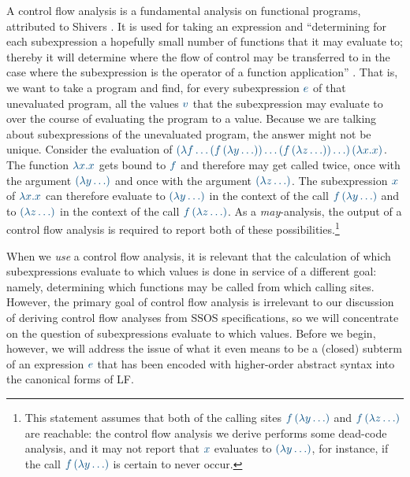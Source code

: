 A control flow analysis is a fundamental analysis on functional
programs, attributed to Shivers \cite{shivers88control}. It is used
for taking an expression and ``determining for each subexpression a
hopefully small number of functions that it may evaluate to; thereby
it will determine where the flow of control may be transferred to in
the case where the subexpression is the operator of a function
application'' \cite[p. 142]{nielson05principles}. That is, we want to
take a program and find, for every subexpression $\obj{e}$ of that
unevaluated program, all the values $\obj{v}$ that the subexpression
may evaluate to over the course of evaluating the program to a
value. Because we are talking about subexpressions of the unevaluated
program, the answer might not be unique. Consider the evaluation of
$\obj{(\lambda f\ldots (f\,(\lambda y\ldots)) \ldots (f\,(\lambda
  z\ldots)) \ldots )\,(\lambda x.x)}$. The function $\obj{\lambda
  x.x}$ gets bound to $\obj{f}$ and therefore may get called twice,
once with the argument $\obj{(\lambda y\ldots)}$ and once with the
argument $\obj{(\lambda z\ldots)}$. The subexpression $\obj{x}$ of
$\obj{\lambda x.x}$ can therefore evaluate to $\obj{(\lambda
  y\ldots)}$ in the context of the call $\obj{f\,(\lambda y\ldots)}$
and to $\obj{(\lambda z\ldots)}$ in the context of the call
$\obj{f\,(\lambda z\ldots)}$. As a {\it may}-analysis, the output of a
control flow analysis is required to report both of these
possibilities.\footnote{This statement assumes that both of the
  calling sites $\obj{f\,(\lambda y\ldots)}$ and $\obj{f\,(\lambda
    z\ldots)}$ are reachable: the control flow analysis we derive
  performs some dead-code analysis, and it may not report that
  $\obj{x}$ evaluates to $\obj{(\lambda y\ldots)}$, for instance, if
  the call $\obj{f\,(\lambda y\ldots)}$ is certain to never occur.}

When we {\it use} a control flow analysis, it is relevant that the
calculation of which subexpressions evaluate to which values is done
in service of a different goal: namely, determining which functions
may be called from which calling sites. However, the primary goal of
control flow analysis is irrelevant to our discussion of deriving
control flow analyses from SSOS specifications, so we will concentrate
on the question of subexpressions evaluate to which values. Before we
begin, however, we will address the issue of what it even means to be
a (closed) subterm of an expression $\obj{e}$ that has been encoded
with higher-order abstract syntax into the canonical forms of LF.

